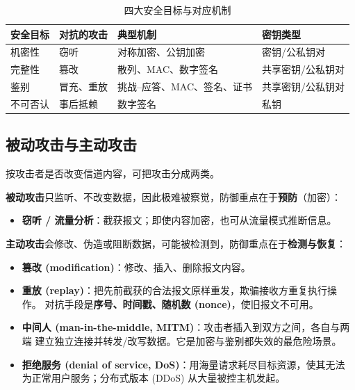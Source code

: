 \begin{table}[H]
\centering
\renewcommand{\arraystretch}{1.4}
\begin{tabulary}{\textwidth}{@{}L L L L@{}}
\toprule
\textbf{安全目标} & \textbf{对抗的攻击} & \textbf{典型机制} & \textbf{密钥类型} \\
\midrule
机密性 & 窃听 & 对称加密、公钥加密 & 密钥/公私钥对 \\
完整性 & 篡改 & 散列、MAC、数字签名 & 共享密钥/公私钥对 \\
鉴别 & 冒充、重放 & 挑战--应答、MAC、签名、证书 & 共享密钥/公私钥对 \\
不可否认 & 事后抵赖 & 数字签名 & 私钥 \\
\bottomrule
\end{tabulary}
\caption{四大安全目标与对应机制}
\label{tab:goals}
\end{table}

\subsection{被动攻击与主动攻击}

按攻击者是否改变信道内容，可把攻击分成两类。

\textbf{被动攻击}只监听、不改变数据，因此极难被察觉，防御重点在于\textbf{预防}（加密）：
\begin{itemize}
    \item \textbf{窃听 / 流量分析}：截获报文；即使内容加密，也可从流量模式推断信息。
\end{itemize}

\textbf{主动攻击}会修改、伪造或阻断数据，可能被检测到，防御重点在于\textbf{检测与恢复}：
\begin{itemize}
    \item \textbf{篡改 (modification)}：修改、插入、删除报文内容。
    \item \textbf{重放 (replay)}：把先前截获的合法报文原样重发，欺骗接收方重复执行操作。
    对抗手段是\textbf{序号、时间戳、随机数 (nonce)}，使旧报文不可用。
    \item \textbf{中间人 (man-in-the-middle, MITM)}：攻击者插入到双方之间，各自与两端
    建立独立连接并转发/改写数据。它是加密与鉴别都失效的最危险场景。
    \item \textbf{拒绝服务 (denial of service, DoS)}：用海量请求耗尽目标资源，使其无法
    为正常用户服务；分布式版本 (DDoS) 从大量被控主机发起。
\end{itemize}

